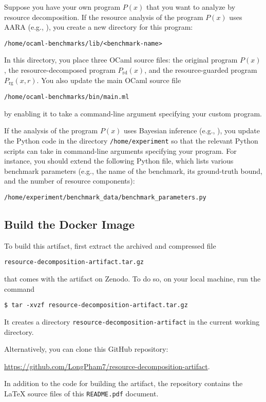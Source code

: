 Suppose you have your own program $P(x)$ that you want to analyze by resource
decomposition.
%
If the resource analysis of the program $P(x)$ uses AARA (e.g.,
), you
create a new directory for this program:
\begin{verbatim}
/home/ocaml-benchmarks/lib/<benchmark-name>
\end{verbatim}
%
In this directory, you place three OCaml source files: the original program
$P(x)$, the resource-decomposed program $P_{\mathrm{rd}}(x)$, and the
resource-guarded program $P_{\mathrm{rg}}(x, r)$.
%
You also update the main OCaml source file
\begin{verbatim}
/home/ocaml-benchmarks/bin/main.ml
\end{verbatim}
by enabling it to take a command-line argument specifying your custom program.

If the analysis of the program $P(x)$ uses Bayesian inference (e.g.,
), you
update the Python code in the directory \texttt{/home/experiment} so that the
relevant Python scripts can take in command-line arguments specifying your
program.
%
For instance, you should extend the following Python file, which lists various
benchmark parameters (e.g., the name of the benchmark, its ground-truth bound,
and the number of resource components):
\begin{verbatim}
/home/experiment/benchmark_data/benchmark_parameters.py
\end{verbatim}

\subsection{Build the Docker Image}
\label{sec:reusability-guide:build-docker-image}

To build this artifact, first extract the archived and compressed file
\begin{verbatim}
resource-decomposition-artifact.tar.gz
\end{verbatim}
that comes with the artifact on Zenodo.
%
To do so, on your local machine, run the command
\begin{verbatim}
$ tar -xvzf resource-decomposition-artifact.tar.gz
\end{verbatim}
%
It creates a directory \texttt{resource-decomposition-artifact} in the current
working directory.

Alternatively, you can clone this GitHub repository:
\begin{center}
  \url{https://github.com/LongPham7/resource-decomposition-artifact}.
\end{center}
%
In addition to the code for building the artifact, the repository contains the
\LaTeX{} source files of this \texttt{README.pdf} document.

